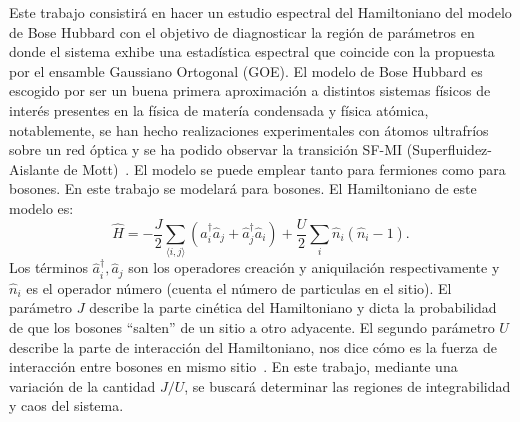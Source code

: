 \documentclass[spanish,titlepage,table]{practicas}
\begin{document}
Este trabajo consistirá en hacer un estudio espectral del Hamiltoniano del modelo de Bose Hubbard 
con el objetivo de diagnosticar la región de parámetros en donde el sistema exhibe una estadística espectral 
que coincide con la propuesta por el ensamble Gaussiano Ortogonal (GOE). El modelo de Bose Hubbard es escogido por ser un buena primera aproximación a distintos sistemas físicos de interés presentes en la física de matería condensada y física atómica, notablemente, 
se han hecho realizaciones experimentales con átomos ultrafríos sobre un red óptica y se ha podido observar la transición SF-MI (Superfluidez-Aislante de Mott)~\cite{Zhang2010}. 
El modelo se puede emplear tanto para fermiones como para bosones. En este trabajo se modelará para bosones. El Hamiltoniano de este modelo es:
\begin{equation}
\hat{H}
= -\frac{J}{2} \sum_{\langle i,j\rangle} \!\left(\hat{a}_i^{\dagger}\hat{a}_j + \hat{a}_j^{\dagger}\hat{a}_i\right)
+ \frac{U}{2}\sum_{i}\hat{n}_i(\hat{n}_i - 1).
\end{equation}
Los términos $\hat{a}_i^{\dagger},\hat{a}_j$ son los operadores creación y aniquilación respectivamente y $\hat{n}_i$ es el operador número (cuenta el número de particulas en el sitio).
El parámetro $J$ describe la parte cinética del Hamiltoniano y dicta la probabilidad de que los bosones ``salten'' de un sitio a otro adyacente. El segundo parámetro $U$ describe la parte de interacción del Hamiltoniano, nos dice cómo  
es la fuerza de interacción entre bosones en mismo sitio~\cite{Zhang2010}. 
En este trabajo, mediante una variación de la cantidad $J/U$, se buscará determinar las regiones de integrabilidad y caos del sistema.
\end{document}
